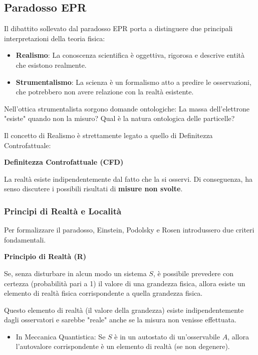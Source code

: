 \subsection{Paradosso EPR}

Il dibattito sollevato dal paradosso EPR porta a distinguere due principali interpretazioni della teoria fisica:

\begin{itemize}
    \item \textbf{Realismo}: La conoscenza scientifica è oggettiva, rigorosa e descrive entità che esistono realmente.
    \item \textbf{Strumentalismo}: La scienza è un formalismo atto a predire le osservazioni, che potrebbero non avere relazione con la realtà esistente.
\end{itemize}

\begin{remark}
    Nell'ottica strumentalista sorgono domande ontologiche: La massa dell'elettrone "esiste" quando non la misuro? Qual è la natura ontologica delle particelle?
\end{remark}

Il concetto di Realismo è strettamente legato a quello di Definitezza Controfattuale:

\begin{definition}
    \textbf{Definitezza Controfattuale (CFD)}
    
    La realtà esiste indipendentemente dal fatto che la si osservi. Di conseguenza, ha senso discutere i possibili risultati di \textbf{misure non svolte}.

\end{definition}

\subsubsection{Principi di Realtà e Località}

Per formalizzare il paradosso, Einstein, Podolsky e Rosen introdussero due criteri fondamentali.

\begin{definition}
    \textbf{Principio di Realtà (R)}
    
    Se, senza disturbare in alcun modo un sistema \( S \), è possibile prevedere con certezza (probabilità pari a 1) il valore di una grandezza fisica, allora esiste un elemento di realtà fisica corrispondente a quella grandezza fisica.
    
    Questo elemento di realtà (il valore della grandezza) esiste indipendentemente dagli osservatori e sarebbe "reale" anche se la misura non venisse effettuata.
    \begin{itemize}
        \item In Meccanica Quantistica: Se \( S \) è in un autostato di un'osservabile \( A \), allora l'autovalore corrispondente è un elemento di realtà (se non degenere).
    \end{itemize}
\end{definition}

